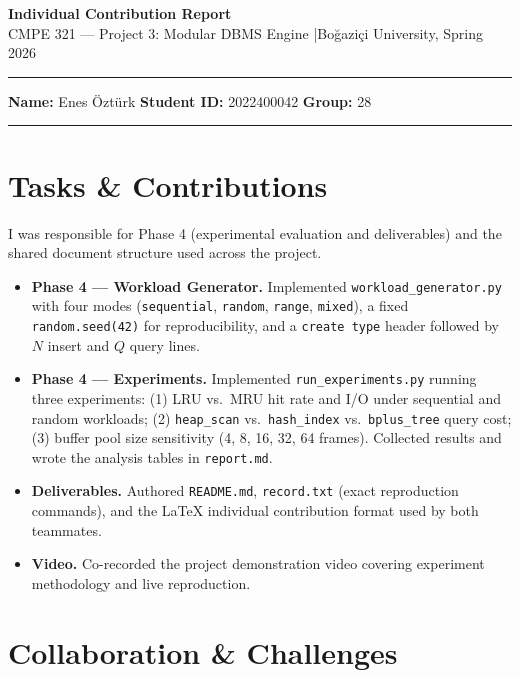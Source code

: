 \documentclass[12pt]{article}
\begin{document}
\begin{center}
    {\large\bfseries Individual Contribution Report}\\[4pt]
    CMPE 321 — Project 3: Modular DBMS Engine \quad|\quad Boğaziçi University, Spring 2026
\end{center}
\hrule\vspace{4pt}
\noindent\textbf{Name:} Enes \"{O}zt\"{u}rk \hfill \textbf{Student ID:} 2022400042 \hfill \textbf{Group:} 28
\vspace{4pt}\hrule

\section{Tasks \& Contributions}

I was responsible for Phase 4 (experimental evaluation and deliverables) and the shared document structure used across the project.

\begin{itemize}[leftmargin=*, itemsep=1pt, topsep=2pt]
    \item \textbf{Phase 4 — Workload Generator.} Implemented \texttt{workload\_generator.py} with four modes (\texttt{sequential}, \texttt{random}, \texttt{range}, \texttt{mixed}), a fixed \texttt{random.seed(42)} for reproducibility, and a \texttt{create type} header followed by $N$ insert and $Q$ query lines.

    \item \textbf{Phase 4 — Experiments.} Implemented \texttt{run\_experiments.py} running three experiments: (1) LRU vs.\ MRU hit rate and I/O under sequential and random workloads; (2) \texttt{heap\_scan} vs.\ \texttt{hash\_index} vs.\ \texttt{bplus\_tree} query cost; (3) buffer pool size sensitivity (4, 8, 16, 32, 64 frames). Collected results and wrote the analysis tables in \texttt{report.md}.

    \item \textbf{Deliverables.} Authored \texttt{README.md}, \texttt{record.txt} (exact reproduction commands), and the \LaTeX{} individual contribution format used by both teammates.

    \item \textbf{Video.} Co-recorded the project demonstration video covering experiment methodology and live reproduction.
\end{itemize}

\section{Collaboration \& Challenges}
\end{document}
